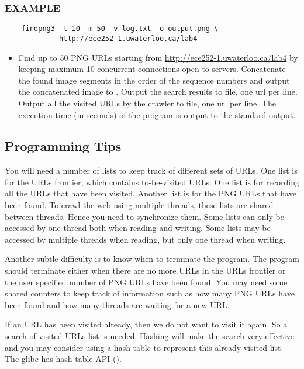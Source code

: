\subsubsection*{EXAMPLE}
\begin{verbatim}
    findpng3 -t 10 -m 50 -v log.txt -o output.png \
             http://ece252-1.uwaterloo.ca/lab4
\end{verbatim}
\begin{itemize}
\item[]Find up to 50 PNG URLs starting from \url{http://ece252-1.uwaterloo.ca/lab4} by keeping maximum 10 concurrent connections open to servers.
Concatenate the found image segments in the order of the sequence numbers and output the concatenated image to \code{output.png}. 
Output the search results to \code{png\_urls.txt} file, one url per line. Output all the visited URLs by the crawler to  file, one url per line. The execution time (in seconds) of the program is output to the standard output.
\end{itemize}


\subsection{Programming Tips}
You will need a number of lists to keep track of different sets of URLs. One list is for the URLs frontier, which contains to-be-visited URLs. One list is for recording all the URLs that have been visited. Another list is for the PNG URLs that have been found. To crawl the web using multiple threads, these lists are shared between threads. Hence you need to synchronize them. Some lists can only be accessed by one thread both when reading and writing. Some lists may be accessed by multiple threads when reading, but only one thread when writing.

Another subtle difficulty is to know when to terminate the program. The program should terminate either when there are no more URLs in the URLs frontier or the user specified number of PNG URLs have been found. You may need some shared counters to keep track of information such as how many PNG URLs have been found and how many threads are waiting for a new URL.

If an URL has been visited already, then we do not want to visit it again. So a search of visited-URLs list is needed. Hashing will make the search very effective and you may consider using a hash table to represent this already-visited list. The glibc has hash table API ().
\fi
